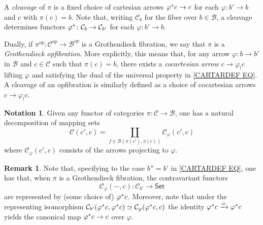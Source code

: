 \documentclass[a4paper,10pt
,draft
]{article}%
\numberwithin{equation}{section}
\numberwithin{figure}{section}
\theoremstyle{definition} %
\newtheorem{remark}[equation]{Remark}%
\newtheorem{notation}[equation]{Notation}%
\newcommand{\1}{\ensuremath{\mathbbm 1}}%
\begin{document}
A \emph{cleavage} of $\pi$ is a fixed choice of cartesian arrows
$\varphi^{\**} c \to c$
for each $\varphi \colon b' \to b$ and $c$ with $\pi(c)=b$.
%
Note that, writing $\mathcal{C}_b$ for the fiber over $b \in \mathcal{B}$, a cleavage determines functors
$\varphi^{\**} \colon \mathcal{C}_b \to \mathcal{C}_{b'}$
for each $\varphi \colon b' \to b$.


Dually, if $\pi^{op} \colon \mathcal{C}^{op} \to \mathcal{B}^{op}$
is a Grothendieck fibration,
we say that $\pi$ is a \emph{Grothendieck opfibration}.
More explicitly, this means that, for any arrow
$\varphi \colon b \to b'$ in $\mathcal{B}$
and $c \in \mathcal{C}$ such that $\pi(c) = b$,
there exists a \emph{cocartesian arrow}
$c \to \varphi_! c$ lifting $\varphi$
and satisfying the dual of the universal property in 
\eqref{CARTARDEF EQ}.
A cleavage of an opfibration is similarly defined as a 
choice of cocartesian arrows $c \to \varphi_!c$.



\begin{notation}\label{MAPSDEC NOT}
	Given any functor of categories
	$\pi \colon \mathcal{C} \to \mathcal{B}$,
	one has a natural decomposition of mapping sets
	\begin{equation}
	\mathcal{C}(c',c) = 
	\coprod_{f \in \mathcal{B}(\pi(c'),\pi(c))}
	\mathcal{C}_{\varphi}\left(c',c \right)
	\end{equation}
	where $\mathcal{C}_{\varphi}\left(c',c \right)$ consists of the arrows projecting to $\varphi$.
\end{notation}



\begin{remark}\label{CARTCHAR REM}
	Note that, specifying to the case $b'' = b'$ in 
	\eqref{CARTARDEF EQ},
	one has that,
	when $\pi$ is a Grothendieck fibration, the contravariant functors
	\begin{equation}\label{FIXPIREP EQ}
	\mathcal{C}_{\varphi}(-,c)
	\colon
	\mathcal{C}_{b'} 
	\to
	\mathsf{Set}
	\end{equation}
	are represented by (some choice of) $\varphi^{\**}c$.
	Moreover, note that under the representing isomorphism
	$\mathcal{C}_{b'}(\varphi^{\**}c,\varphi^{\**}c)
	\simeq \mathcal{C}_{\varphi}(\varphi^{\**}c,c)$
	the identity
	$\varphi^{\**}c \xrightarrow{=} \varphi^{\**}c$
	yields the canonical map
	$\varphi^{\**}c \to c$ over $\varphi$.
\end{remark}
\end{document}
